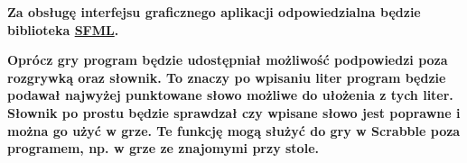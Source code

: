 \documentclass[11pt]{article}
\newcommand{\sepspace}{\vspace*{1.3em}}               %
\newcommand{\Description}[1]{
    \noindent\textbf{#1}
    \par
    \normalsize
}
\begin{document}
\sepspace

\Description{
Za obsługę interfejsu graficznego aplikacji odpowiedzialna będzie biblioteka \href{https://www.sfml-dev.org/index.php}{SFML}.
}

\sepspace
\Description{
Oprócz gry program będzie udostępniał możliwość podpowiedzi poza rozgrywką oraz słownik. To znaczy po wpisaniu liter program będzie podawał najwyżej punktowane słowo możliwe do ułożenia z tych liter. Słownik po prostu będzie sprawdzał czy wpisane słowo jest poprawne i można go użyć w grze. Te funkcję mogą służyć do gry w Scrabble poza programem, np. w grze ze znajomymi przy stole.
}
\end{document}
